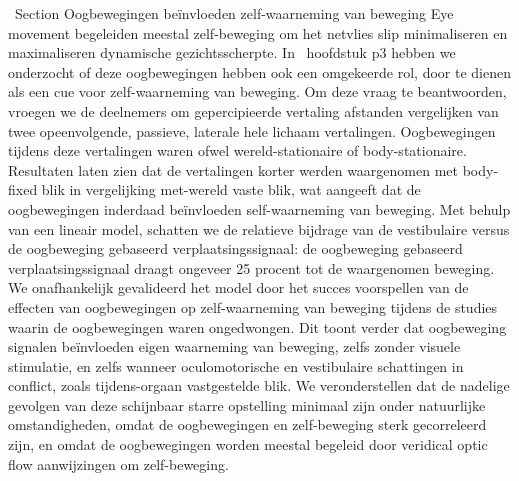 \ Section {Oogbewegingen beïnvloeden zelf-waarneming van beweging}
Eye movement begeleiden meestal zelf-beweging om het netvlies slip minimaliseren en maximaliseren dynamische gezichtsscherpte. In \ hoofdstuk {p3} hebben we onderzocht of deze oogbewegingen hebben ook een omgekeerde rol, door te dienen als een cue voor zelf-waarneming van beweging. Om deze vraag te beantwoorden, vroegen we de deelnemers om gepercipieerde vertaling afstanden vergelijken van twee opeenvolgende, passieve, laterale hele lichaam vertalingen. Oogbewegingen tijdens deze vertalingen waren ofwel wereld-stationaire of body-stationaire. Resultaten laten zien dat de vertalingen korter werden waargenomen met body-fixed blik in vergelijking met-wereld vaste blik, wat aangeeft dat de oogbewegingen inderdaad beïnvloeden self-waarneming van beweging. Met behulp van een lineair model, schatten we de relatieve bijdrage van de vestibulaire versus de oogbeweging gebaseerd verplaatsingssignaal: de oogbeweging gebaseerd verplaatsingssignaal draagt ​​ongeveer 25 procent tot de waargenomen beweging. We onafhankelijk gevalideerd het model door het succes voorspellen van de effecten van oogbewegingen op zelf-waarneming van beweging tijdens de studies waarin de oogbewegingen waren ongedwongen. Dit toont verder dat oogbeweging signalen beïnvloeden eigen waarneming van beweging, zelfs zonder visuele stimulatie, en zelfs wanneer oculomotorische en vestibulaire schattingen in conflict, zoals tijdens-orgaan vastgestelde blik. We veronderstellen dat de nadelige gevolgen van deze schijnbaar starre opstelling minimaal zijn onder natuurlijke omstandigheden, omdat de oogbewegingen en zelf-beweging sterk gecorreleerd zijn, en omdat de oogbewegingen worden meestal begeleid door veridical optic flow aanwijzingen om zelf-beweging.

